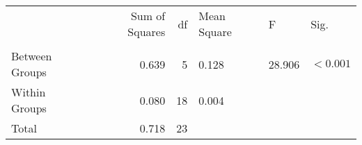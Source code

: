\begin{tabular}{lrrlll}
\toprule
 & Sum of Squares & df & Mean Square & F & Sig. \\
 &  &  &  &  &  \\
\midrule
Between Groups & 0.639 & 5 & 0.128 & 28.906 & $< 0.001$ \\
Within Groups & 0.080 & 18 & 0.004 &  &  \\
Total & 0.718 & 23 &  &  &  \\
\bottomrule
\end{tabular}
